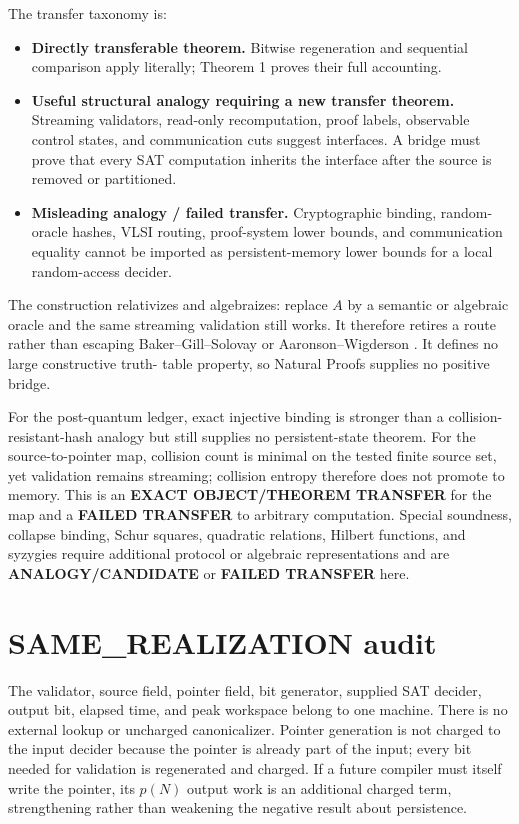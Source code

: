 \documentclass[11pt]{article}
\begin{document}
The transfer taxonomy is:
\begin{itemize}
\item \textbf{Directly transferable theorem.}  Bitwise regeneration and
sequential comparison apply literally; Theorem 1 proves their full accounting.
\item \textbf{Useful structural analogy requiring a new transfer theorem.}
Streaming validators, read-only recomputation, proof labels, observable
control states, and communication cuts suggest interfaces.  A bridge must
prove that every SAT computation inherits the interface after the source is
removed or partitioned.
\item \textbf{Misleading analogy / failed transfer.}  Cryptographic binding,
random-oracle hashes, VLSI routing, proof-system lower bounds, and
communication equality cannot be imported as persistent-memory lower bounds
for a local random-access decider.
\end{itemize}

The construction relativizes and algebraizes: replace $A$ by a semantic or
algebraic oracle and the same streaming validation still works.  It therefore
retires a route rather than escaping Baker--Gill--Solovay or
Aaronson--Wigderson \cite{BGS75,AW09}.  It defines no large constructive truth-
table property, so Natural Proofs supplies no positive bridge.

For the post-quantum ledger, exact injective binding is stronger than a
collision-resistant-hash analogy but still supplies no persistent-state
theorem.  For the source-to-pointer map, collision count is minimal on the
tested finite source set, yet validation remains streaming; collision entropy
therefore does not promote to memory.  This is an
\textbf{EXACT OBJECT/THEOREM TRANSFER} for the map and a
\textbf{FAILED TRANSFER} to arbitrary computation.  Special soundness,
collapse binding, Schur squares, quadratic relations, Hilbert functions, and
syzygies require additional protocol or algebraic representations and are
\textbf{ANALOGY/CANDIDATE} or \textbf{FAILED TRANSFER} here.

\section{SAME\_REALIZATION audit}

The validator, source field, pointer field, bit generator, supplied SAT
decider, output bit, elapsed time, and peak workspace belong to one machine.
There is no external lookup or uncharged canonicalizer.  Pointer generation
is not charged to the input decider because the pointer is already part of
the input; every bit needed for validation is regenerated and charged.  If a
future compiler must itself write the pointer, its $p(N)$ output work is an
additional charged term, strengthening rather than weakening the negative
result about persistence.
\end{document}

